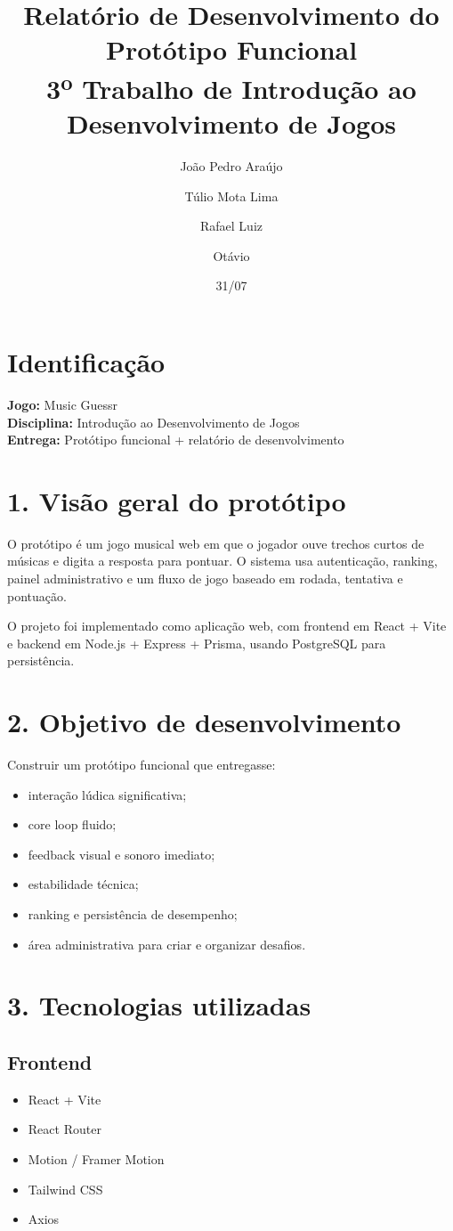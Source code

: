 \documentclass[12pt,a4paper]{article}
\title{Relatório de Desenvolvimento do Protótipo Funcional\\\large 3\textsuperscript{o} Trabalho de Introdução ao Desenvolvimento de Jogos}
\author{João Pedro Araújo \and Túlio Mota Lima \and Rafael Luiz \and Otávio}
\date{31/07}
\begin{document}
\maketitle

\section*{Identificação}
\textbf{Jogo:} Music Guessr\\
\textbf{Disciplina:} Introdução ao Desenvolvimento de Jogos\\
\textbf{Entrega:} Protótipo funcional + relatório de desenvolvimento

\section*{1. Visão geral do protótipo}
O protótipo é um jogo musical web em que o jogador ouve trechos curtos de músicas e digita a resposta para pontuar. O sistema usa autenticação, ranking, painel administrativo e um fluxo de jogo baseado em rodada, tentativa e pontuação.

O projeto foi implementado como aplicação web, com frontend em React + Vite e backend em Node.js + Express + Prisma, usando PostgreSQL para persistência.

\section*{2. Objetivo de desenvolvimento}
Construir um protótipo funcional que entregasse:
\begin{itemize}[leftmargin=1.2em]
  \item interação lúdica significativa;
  \item core loop fluido;
  \item feedback visual e sonoro imediato;
  \item estabilidade técnica;
  \item ranking e persistência de desempenho;
  \item área administrativa para criar e organizar desafios.
\end{itemize}

\section*{3. Tecnologias utilizadas}
\subsection*{Frontend}
\begin{itemize}[leftmargin=1.2em]
  \item React + Vite
  \item React Router
  \item Motion / Framer Motion
  \item Tailwind CSS
  \item Axios
\end{itemize}
\end{document}

